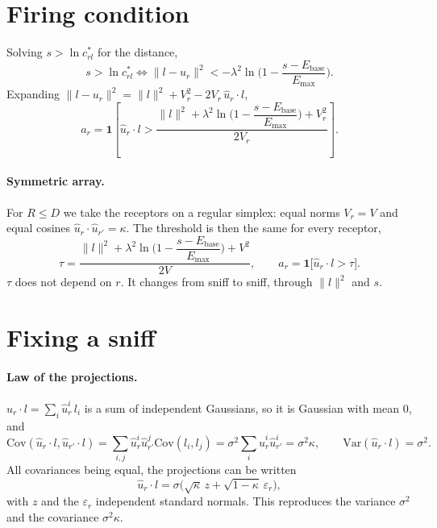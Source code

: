 \documentclass[11pt,a4paper]{article}
\newcommand{\Var}{\mathrm{Var}}
\newcommand{\Cov}{\mathrm{Cov}}
\newcommand{\Ebase}{E_{\mathrm{base}}}
\newcommand{\Emax}{E_{\mathrm{max}}}
\newcommand{\uhat}{\hat{u}}
\newcommand{\one}{\mathbf{1}}
\begin{document}
\section{Firing condition}

Solving $s>\ln c^*_{rl}$ for the distance,
\begin{equation}
  s>\ln c^*_{rl}
  \iff
  \|l-u_r\|^2<-\lambda^2\ln\Big(1-\frac{s-\Ebase}{\Emax}\Big).
\end{equation}
Expanding $\|l-u_r\|^2=\|l\|^2+V_r^2-2V_r\,\uhat_r\cdot l$,
\begin{equation}
  a_r=\one\left[\uhat_r\cdot l>
  \frac{\|l\|^2+\lambda^2\ln\Big(1-\dfrac{s-\Ebase}{\Emax}\Big)+V_r^2}{2V_r}\right].
  \label{eq:fire}
\end{equation}

\paragraph{Symmetric array.} For $R\le D$ we take the receptors on a regular simplex:
equal norms $V_r=V$ and equal cosines $\uhat_r\cdot\uhat_{r'}=\kappa$. The threshold is
then the same for every receptor,
\begin{equation}
  \tau=\frac{\|l\|^2+\lambda^2\ln\Big(1-\dfrac{s-\Ebase}{\Emax}\Big)+V^2}{2V},
  \qquad
  a_r=\one\big[\uhat_r\cdot l>\tau\big].
  \label{eq:tau}
\end{equation}
$\tau$ does not depend on $r$. It changes from sniff to sniff, through $\|l\|^2$ and $s$.

\section{Fixing a sniff}

\paragraph{Law of the projections.} $\uhat_r\cdot l=\sum_i\hat u_r^i\,l_i$ is a sum of
independent Gaussians, so it is Gaussian with mean $0$, and
\begin{equation}
  \Cov(\uhat_r\cdot l,\uhat_{r'}\cdot l)
  =\sum_{i,j}\hat u_r^i\hat u_{r'}^j\Cov(l_i,l_j)
  =\sigma^2\sum_i\hat u_r^i\hat u_{r'}^i
  =\sigma^2\kappa ,
  \qquad
  \Var(\uhat_r\cdot l)=\sigma^2 .
\end{equation}
All covariances being equal, the projections can be written
\begin{equation}
  \uhat_r\cdot l=\sigma\big(\sqrt\kappa\,z+\sqrt{1-\kappa}\,\varepsilon_r\big),
  \label{eq:decomp}
\end{equation}
with $z$ and the $\varepsilon_r$ independent standard normals. This reproduces the variance
$\sigma^2$ and the covariance $\sigma^2\kappa$.
\end{document}

